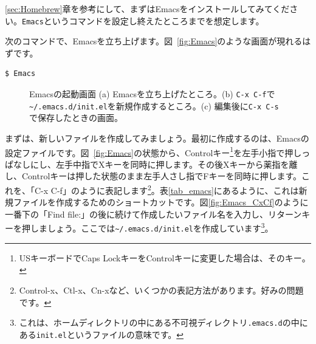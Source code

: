 \ref{sec:Homebrew}章を参考にして、まずはEmacsをインストールしてみてください。\texttt{Emacs}というコマンドを設定し終えたところまでを想定します。

次のコマンドで、Emacsを立ち上げます。図~\ref{fig:Emacs}のような画面が現れるはずです。
\begin{lstlisting}[language=bash]
$ Emacs
\end{lstlisting}

\begin{figure}
  \centering
  \hfill%
  \hfill%
  \caption{Emacsの起動画面 (a) Emacsを立ち上げたところ。(b) \texttt{C-x C-f}で\texttt{\~{}/.emacs.d/init.el}を新規作成するところ。(c) 編集後に\texttt{C-x C-s}で保存したときの画面。}
\end{figure}

まずは、新しいファイルを作成してみましょう。最初に作成するのは、Emacsの設定ファイルです。図~\ref{fig:Emacs}の状態から、Controlキー\footnote{USキーボードでCaps LockキーをControlキーに変更した場合は、そのキー。}を左手小指で押しっぱなしにし、左手中指でXキーを同時に押します。その後Xキーから薬指を離し、Controlキーは押した状態のまま左手人さし指でFキーを同時に押します。これを、「C-x C-f」のように表記します\footnote{Control-x、Ctl-x、Cn-xなど、いくつかの表記方法があります。好みの問題です。}。表\ref{tab_emacs}にあるように、これは新規ファイルを作成するためのショートカットです。図\ref{fig:Emacs_CxCf}のように一番下の「Find file:」の後に続けて作成したいファイル名を入力し、リターンキーを押しましょう。ここでは\texttt{\~{}/.emacs.d/init.el}を作成しています\footnote{これは、ホームディレクトリの中にある不可視ディレクトリ\texttt{.emacs.d}の中にある\texttt{init.el}というファイルの意味です。}。

